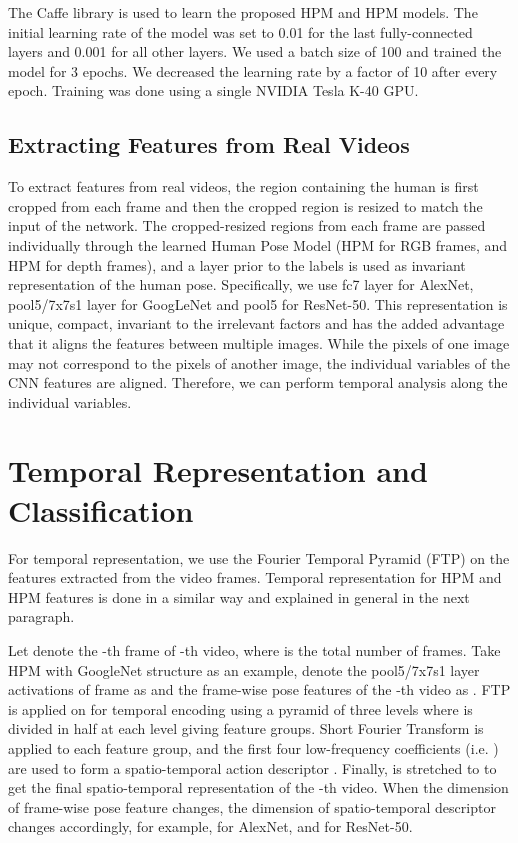 \documentclass[twocolumn]{svjour3}          \smartqed  \usepackage{graphicx}
\begin{document}
The Caffe library \citep{jia2014caffe} is used to learn the proposed HPM and HPM models. The initial learning rate of the model was set to 0.01 for the last fully-connected layers and 0.001 for all other layers. We used a batch size of 100 and trained the model for 3 epochs. We decreased the learning rate by a factor of 10 after every epoch. Training was done using a single NVIDIA Tesla K-40 GPU.

\subsection{Extracting Features from Real Videos}

To extract features from real videos, the region containing the human is first cropped from each frame and then the cropped region is resized to match the input of the network. The cropped-resized regions from each frame are passed individually through the learned Human Pose Model (HPM for RGB frames, and HPM for depth frames), and a layer prior to the labels is used as invariant representation of the human pose. Specifically, we use fc7 layer for AlexNet, pool5/7x7s1 layer for GoogLeNet and pool5 for ResNet-50. This representation is unique, compact, invariant to the irrelevant factors and  has the added advantage that it aligns the features between multiple images. While the pixels of one image may not correspond to the pixels of another image, the individual variables of the CNN features are aligned. Therefore, we can perform temporal analysis along the individual variables.

\section{Temporal Representation and Classification}
For temporal representation, we use the Fourier Temporal Pyramid (FTP) \citep{wang2013learning} on the features extracted from the video frames. Temporal representation for HPM and HPM features is done in a similar way and explained in general in the next paragraph.


Let  denote the -th frame of -th video,  where  is the total number of frames. Take HPM with GoogleNet structure as an example, denote the pool5/7x7s1 layer activations of frame  as  and the frame-wise pose features of the -th video as . FTP is applied on  for temporal encoding using a pyramid of three levels where  is divided in half at each level giving  feature groups. Short Fourier Transform is applied to each feature group, and the first four low-frequency coefficients (i.e. ) are used to form a spatio-temporal action descriptor . Finally,  is stretched to  to get the final spatio-temporal representation of the -th video. When the dimension of frame-wise pose feature changes, the dimension of spatio-temporal descriptor changes accordingly, for example,  for AlexNet, and  for ResNet-50.
\end{document}
